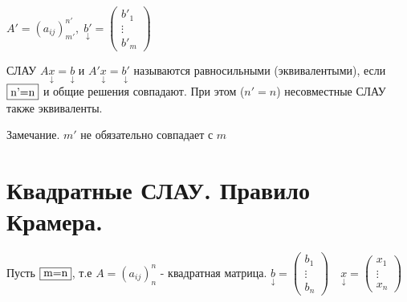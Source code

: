 \documentclass[../main.tex]{subfiles}
\begin{document}
$A' = (a_{ij})_{m'}^{n'}, \; \underset{\downarrow}{b'}=\begin{pmatrix} {b'}_{1}\\ \vdots\\ {b'}_{m} \end{pmatrix}$
\begin{definition}
    СЛАУ $A \underset{\downarrow}{x}=\underset{\downarrow}{b}$ и $A'\underset{\downarrow}{x}=\underset{\downarrow}{b'}$ называются равносильными (эквивалентыми), если $\fbox{n'=n}$ и общие решения совпадают. При этом ($n'=n$) несовместные СЛАУ также эквиваленты.
\end{definition} 
\noindent Замечание. $m'$ не обязательно совпадает с $m$
\section{Квадратные СЛАУ. Правило Крамера.}
Пусть $\fbox{m=n}$, т.е $A=(a_{ij})_{n}^{n}$ - квадратная матрица. $\underset{\downarrow}{b}=\begin{pmatrix} {b}_{1}\\ \vdots\\ {b}_{n} \end{pmatrix}\quad \underset{\downarrow}{x}=\begin{pmatrix} {x}_{1}\\ \vdots\\ {x}_{n} \end{pmatrix}$
\end{document}
